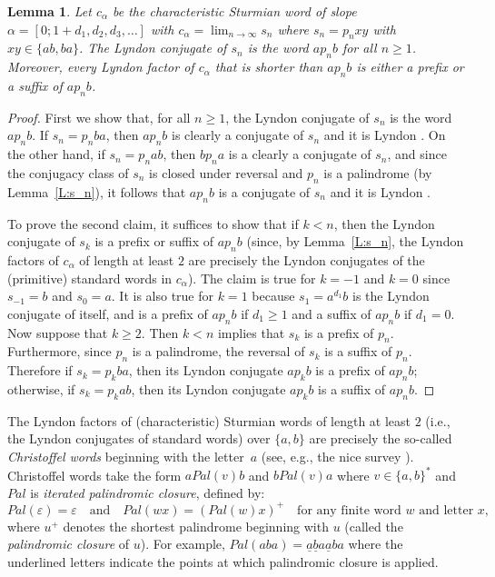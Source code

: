 \documentclass[11pt]{amsart}
\newcommand{\1}{\bar{1}}
\newcommand{\empt}{\varepsilon}
\theoremstyle{plain}
\newtheorem{lemma}[theorem]{Lemma}
\theoremstyle{definition}
\theoremstyle{remark}
\begin{document}
\begin{lemma} \label{L:characteristic}  Let $c_\alpha$ be the characteristic Sturmian word of slope $\alpha = [0; 1+d_1, d_2, d_3, \ldots]$ with $c_\alpha = \lim_{n\to\infty}s_n$ where $s_n = p_nxy$ with $xy \in \{ab, ba\}$. The Lyndon conjugate of $s_n$ is the word $ap_nb$ for all $n \geq 1$. Moreover, every Lyndon factor of $c_\alpha$ that is shorter than $ap_nb$ is either a prefix or a suffix of $ap_nb$.
\end{lemma}
\begin{proof}
First we show that, for all $n\geq 1$, the Lyndon conjugate of $s_n$ is the word $ap_nb$. If $s_n = p_nba$, then $ap_nb$ is clearly a conjugate of $s_n$ and it is Lyndon \cite{jBaD97stur,aD97stur}. On the other hand, if $s_n = p_nab$, then $bp_na$ is a clearly a conjugate of $s_n$, and since the conjugacy class of $s_n$ is closed under reversal and $p_n$ is a palindrome (by Lemma~\ref{L:s_n}), it follows that $ap_nb$ is a conjugate of $s_n$ and it is Lyndon \cite{jBaD97stur,aD97stur}.

To prove the second claim, it suffices to show that if $k<n$, then the Lyndon conjugate of $s_k$ is a prefix or suffix of $ap_nb$ (since, by Lemma~\ref{L:s_n}, the Lyndon factors of $c_\alpha$ of length at least $2$  are precisely the Lyndon conjugates of the (primitive) standard words in $c_\alpha$).   The claim is true for $k = -1$ and $k=0$ since $s_{-1} = b$ and  $s_0=a$. It is also true for $k=1$ because $s_1=a^{d_1}b$ is the Lyndon conjugate of itself, and is a prefix of $ap_nb$ if $d_1 \geq 1$ and a suffix of $ap_nb$ if $d_1 =0$. Now suppose that $k \geq 2$. Then $k<n$ implies that $s_k$ is a prefix of $p_n$. Furthermore, since $p_n$ is a palindrome, the reversal of $s_k$ is a suffix of $p_n$. Therefore if $s_k = p_kba$, then its Lyndon conjugate $ap_kb$ is a prefix of $ap_nb$; otherwise, if $s_k = p_kab$, then its Lyndon conjugate $ap_kb$ is a suffix of $ap_nb$.
\end{proof}


The Lyndon factors of (characteristic) Sturmian words of length at least $2$ (i.e., the Lyndon conjugates of standard words) over $\{a,b\}$ are precisely the so-called \textit{Christoffel words} beginning with the letter~$a$ (see, e.g., the nice survey \cite{jB07stur}). Christoffel words take the form $aPal(v)b$ and $bPal(v)a$ where $v \in \{a,b\}^*$ and $Pal$ is \textit{iterated palindromic closure}, defined by:
\[
Pal(\empt) = \empt  \quad \mbox{and} \quad  Pal(wx) = (Pal(w)x)^+ \quad \mbox{for any finite word $w$ and letter $x$},
\]
where $u^+$ denotes the shortest palindrome beginning with $u$ (called the \textit{palindromic closure} of $u$). For example, $Pal(aba) = \underline{a}\underline{b}a\underline{a}ba$ where the underlined letters indicate the points at which palindromic closure is applied.
\end{document}
